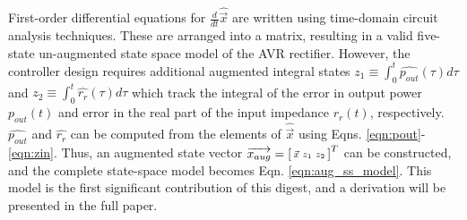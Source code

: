 \documentclass[journal, onecolumn, final, letterpaper, 11pt]{IEEEtran}
\begin{document}
First-order differential equations for $\frac{d}{dt}\widehat{\vec{x}}$ are written using time-domain circuit analysis techniques. These are arranged into a matrix, resulting in a valid five-state un-augmented state space model of the AVR rectifier. However, the controller design requires additional augmented integral states $z_1 \equiv \int_0^t \widehat{p_{out}}(\tau) d\tau$ and $z_2 \equiv \int_0^t \widehat{r_r}(\tau) d\tau$ which track the integral of the error in output power $p_{out}(t)$ and error in the real part of the input impedance $r_r(t)$, respectively. $\widehat{p_{out}}$ and $\widehat{r_r}$ can be computed from the elements of $\widehat{\vec{x}}$ using Eqns. \ref{eqn:pout}-\ref{eqn:zin}. Thus, an augmented state vector $\overrightarrow{x_{aug}} = \begin{bsmallmatrix} \vec{x} & z_1 & z_2 \end{bsmallmatrix}^T$ can be constructed, and the complete state-space model becomes Eqn. \ref{eqn:aug_ss_model}. This model is the first significant contribution of this digest, and a derivation will be presented in the full paper.

\vspace{-0.1cm}
\end{document}
